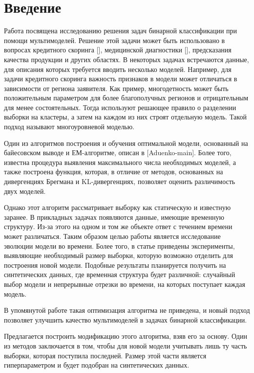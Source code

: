 \documentclass[12pt,twoside]{article}
\title
    {Мультимоделирование как универсальный способ описания выборки общего вида}
\author
    {Логинов~Р.\,А., Адуенко~А.\,А., Стрижов~В.\,В.} %
\begin{document}
\maketitle

\section{Введение}

Работа посвящена исследованию решения задач бинарной классификации при помощи мультимоделей. Решение этой задачи может быть использовано в вопросах кредитного скоринга [], медицинской диагностики [], предсказания качества продукции и других областях. В некоторых задачах встречаются данные, для описания которых требуется вводить несколько моделей. Например, для задачи кредитного скоринга важность признаков в модели может отличаться в зависимости от региона заявителя. Как пример, многодетность может быть положительным параметром для более благополучных регионов и отрицательным для менее состоятельных. Тогда используют решающее правило о разделении выборки на кластеры, а затем на каждом из них строят отдельную модель. Такой подход называют многоуровневой моделью.

Один из алгоритмов построения и обучения оптимальной модели, основанный на байесовском выводе и ЕМ-алгоритме, описан в [Aduenko-main]. Более того, известна процедура выявления максимального числа необходимых моделей, а также построена функция, которая, в отличие от методов, основанных на дивергенциях Брегмана и KL-дивергенциях, позволяет оценить различимость двух моделей.

Однако этот алгоритм рассматривает выборку как статическую и известную заранее. В прикладных задачах появляются данные, имеющие временную структуру. Из-за этого на одном и том же объекте ответ с течением времени может различаться. Таким образом целью работы является исследование эволюции модели во времени. Более того, в статье приведены эксперименты, выявляющие необходимый размер выборки, которую возможно отделить для построения новой модели. Подобные результаты планируется получить на синтетических данных, где временная структура будет различной: случайный выбор модели и непрерывные отрезки во времени, на которых поступает каждая модель.

В упомянутой работе такая оптимизация алгоритма не приведена, и новый подход позволяет улучшить качество мультимоделей в задачах бинарной классификации.  

Предлагается построить модификацию этого алгоритма, взяв его за основу. Один из методов заключается в том, чтобы для новой модели учитывать лишь ту часть выборки, которая поступила последней. Размер этой части является гиперпараметром и будет подобран на синтетических данных.
\end{document}
